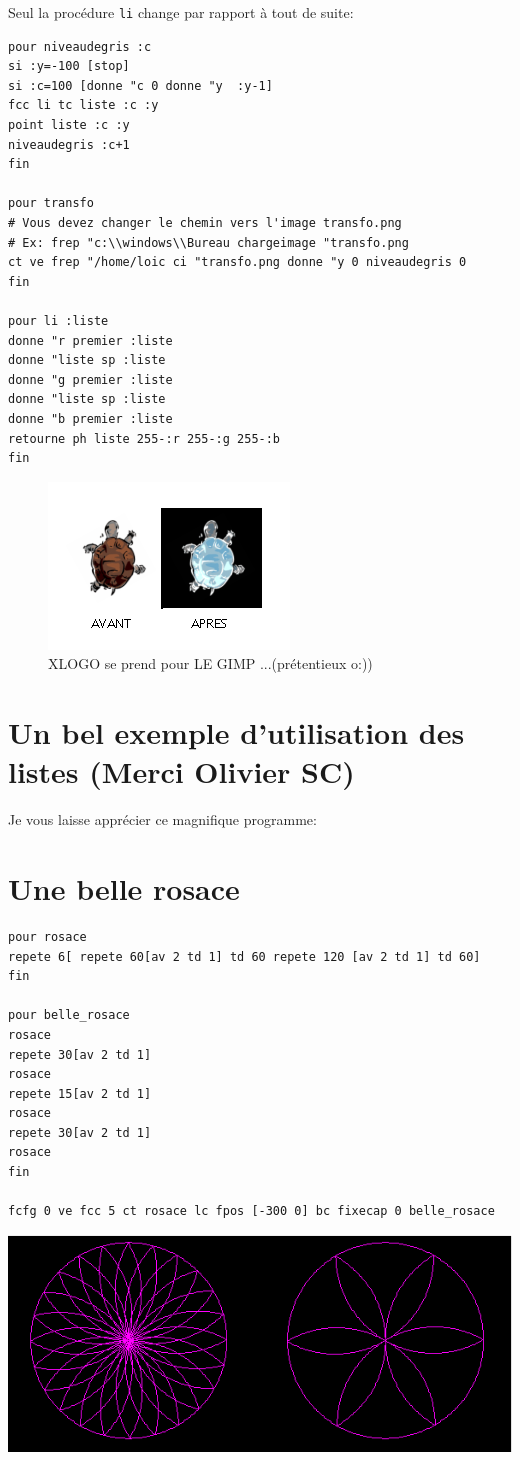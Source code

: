Seul la procédure \texttt{li} change par rapport à tout de suite:
\pagebreak
\begin{verbatim}
pour niveaudegris :c
si :y=-100 [stop]
si :c=100 [donne "c 0 donne "y  :y-1] 
fcc li tc liste :c :y
point liste :c :y
niveaudegris :c+1
fin

pour transfo
# Vous devez changer le chemin vers l'image transfo.png 
# Ex: frep "c:\\windows\\Bureau chargeimage "transfo.png 
ct ve frep "/home/loic ci "transfo.png donne "y 0 niveaudegris 0
fin

pour li :liste
donne "r premier :liste
donne "liste sp :liste
donne "g premier :liste
donne "liste sp :liste
donne "b premier :liste
retourne ph liste 255-:r 255-:g 255-:b  
fin

\end{verbatim} 
\begin{figure}[h]
\includegraphics{images/transfo2.png}
\caption{XLOGO se prend pour LE GIMP ...(prétentieux o:))}
\end{figure}

\section{Un bel exemple d'utilisation des listes (Merci Olivier SC)}

Je vous laisse apprécier ce magnifique programme:


\section{Une belle rosace}
\begin{verbatim}
pour rosace
repete 6[ repete 60[av 2 td 1] td 60 repete 120 [av 2 td 1] td 60]
fin

pour belle_rosace
rosace 
repete 30[av 2 td 1]
rosace
repete 15[av 2 td 1]
rosace
repete 30[av 2 td 1]
rosace
fin

fcfg 0 ve fcc 5 ct rosace lc fpos [-300 0] bc fixecap 0 belle_rosace
\end{verbatim} 
\includegraphics[width=14cm]{images/rosace2.png}

